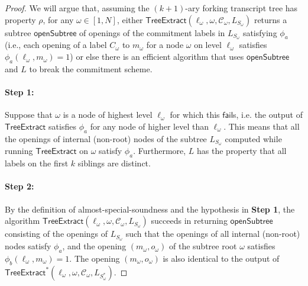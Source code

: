 \documentclass{article}
\theoremstyle{definition}
\begin{document}
\begin{proof}
We will argue that, assuming the $(k+1)$-ary forking transcript tree has property $\rho$, for any $\omega \in [1,N]$, either $\textsf{TreeExtract}(\ell_\omega, \omega, \mathcal{C}_\omega, L_{S_\omega})$ returns a subtree $\textsf{openSubtree}$ of openings of the commitment labels in $L_{S_\omega}$ satisfying $\phi_a$ (i.e., each opening of a label $C_\omega$ to $m_\omega$ for a node $\omega$ on level $\ell_\omega$ satisfies $\phi_a(\ell_\omega, m_\omega) = 1$) or else there is an efficient algorithm that uses $\textsf{openSubtree}$ and $L$ to break the commitment scheme. 


\paragraph{Step 1:} Suppose that $\omega$ is a node of highest level $\ell_{\omega}$ for which this $\mathsf{fail}$s, i.e. the output of $\textsf{TreeExtract}$ satisfies $\phi_a$ for any node of higher level than $\ell_\omega$. 
This means that all the openings of internal (non-root) nodes of the subtree $L_{S_\omega}$ computed while running $\textsf{TreeExtract}$ on $\omega$ satisfy $\phi_a$. Furthermore, $L$ has the property that all labels on the first $k$ siblings are distinct. 

\paragraph{Step 2:} By the definition of almost-special-soundness and the hypothesis in \textbf{Step 1}, the algorithm $\textsf{TreeExtract}(\ell_\omega, \omega, \mathcal{C}_\omega, L_{S_\omega})$ succeeds in returning $\textsf{openSubtree}$ consisting of the openings of $L_{S_\omega}$ such that the openings of all internal (non-root) nodes satisfy $\phi_a$, and the opening $(m_\omega, o_\omega)$ of the subtree root $\omega$ satisfies $\phi_b(\ell_\omega, m_\omega) = 1$. The opening $(m_\omega, o_\omega)$ is also identical to the output of $\textsf{TreeExtract}^*(\ell_\omega, \omega, \mathcal{C}_\omega, L_{S^*_\omega})$. 


\end{proof}
\end{document}
